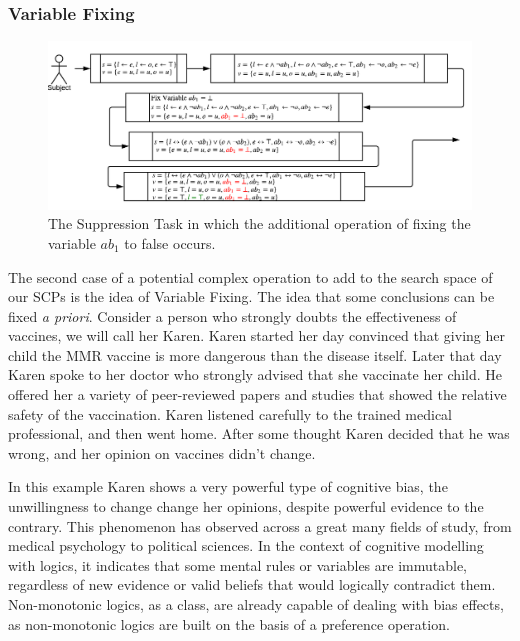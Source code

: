 \documentclass{article}
\begin{document}
\subsubsection*{Variable Fixing} \label{ssec:variableFixing}

\begin{figure}
\begin{center}
\includegraphics[width=\linewidth]{suppressionSCP_mod2}
\end{center}

\caption{The Suppression Task in which the additional operation of fixing the variable $ab_1$ to false occurs.}
\label{fig:supmod2}
\end{figure}

The second case of a potential complex operation to add to the search space of our SCPs is the idea of Variable Fixing. The idea that some  conclusions can be fixed \textit{a priori}. Consider a person who strongly doubts the effectiveness of vaccines, we will call her Karen. Karen started her day convinced that giving her child the MMR vaccine is more dangerous than the disease itself. Later that day Karen spoke to her doctor who strongly advised that she vaccinate her child. He offered her a variety of peer-reviewed papers and studies that showed the relative safety of the vaccination. Karen listened carefully to the trained medical professional, and then went home. After some thought Karen decided that he was wrong, and her opinion on vaccines didn't change.

In this example Karen shows a very powerful type of cognitive bias, the unwillingness to change change her opinions, despite powerful evidence to the contrary. This phenomenon has observed across a great many fields of study, from medical psychology \citep{brown2010omission} \citep{wroe2005feeling} to political sciences\citep{tappin2017heart}. In the context of cognitive modelling with logics, it indicates that some mental rules or variables are immutable, regardless of new evidence or valid beliefs that would logically contradict them. Non-monotonic logics, as a class, are already capable of dealing with bias effects, as non-monotonic logics are built on the basis of a preference operation.
\end{document}
